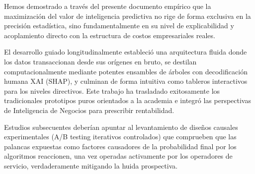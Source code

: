Hemos demostrado a través del presente documento empírico que la maximización del valor de inteligencia predictiva no rige de forma exclusiva en la precisión estadística, sino fundamentalmente en su nivel de explicabilidad y acoplamiento directo con la estructura de costos empresariales reales. 

El desarrollo guiado longitudinalmente estableció una arquitectura fluida donde los datos transaccionan desde sus orígenes en bruto, se destilan computacionalmente mediante potentes ensambles de árboles con decodificación humana XAI (SHAP), y culminan de forma intuitiva como tableros interactivos para los niveles directivos. Este trabajo ha trasladado exitosamente los tradicionales prototipos puros orientados a la academia e integró las perspectivas de Inteligencia de Negocios para prescribir rentabilidad.

Estudios subsecuentes deberían apuntar al levantamiento de diseños causales experimentales (A/B testing iterativos controlados) que comprueben que las palancas expuestas como factores causadores de la probabilidad final por los algoritmos reaccionen, una vez operadas activamente por los operadores de servicio, verdaderamente mitigando la huida prospectiva.
